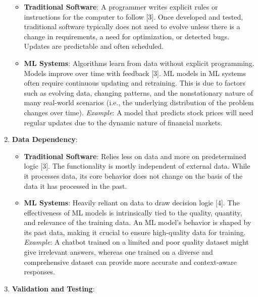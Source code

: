 \documentclass[
  letterpaper,
  DIV=11,
  numbers=noendperiod]{scrartcl}
\providecommand{\tightlist}{%
  \setlength{\itemsep}{0pt}\setlength{\parskip}{0pt}}\usepackage{longtable,booktabs,array}
\begin{document}
\begin{enumerate}
  \begin{itemize}
  \tightlist
  \item
    \textbf{Traditional Software}: A programmer writes explicit rules or
    instructions for the computer to follow {[}3{]}. Once developed and
    tested, traditional software typically does not need to evolve
    unless there is a change in requirements, a need for optimization,
    or detected bugs. Updates are predictable and often scheduled.
  \item
    \textbf{ML Systems}: Algorithms learn from data without explicit
    programming. Models improve over time with feedback {[}3{]}. ML
    models in ML systems often require continuous updating and
    retraining. This is due to factors such as evolving data, changing
    patterns, and the nonstationary nature of many real-world scenarios
    (i.e., the underlying distribution of the problem changes over
    time). \emph{Example}: A model that predicts stock prices will need
    regular updates due to the dynamic nature of financial markets.
  \end{itemize}
\item
  \textbf{Data Dependency}:

  \begin{itemize}
  \tightlist
  \item
    \textbf{Traditional Software}: Relies less on data and more on
    predetermined logic {[}3{]}. The functionality is mostly independent
    of external data. While it processes data, its core behavior does
    not change on the basis of the data it has processed in the past.
  \item
    \textbf{ML Systems}: Heavily reliant on data to draw decision logic
    {[}4{]}. The effectiveness of ML models is intrinsically tied to the
    quality, quantity, and relevance of the training data. An ML model's
    behavior is shaped by its past data, making it crucial to ensure
    high-quality data for training. \emph{Example}: A chatbot trained on
    a limited and poor quality dataset might give irrelevant answers,
    whereas one trained on a diverse and comprehensive dataset can
    provide more accurate and context-aware responses.
  \end{itemize}
\item
  \textbf{Validation and Testing}:


\end{enumerate}
\end{document}
